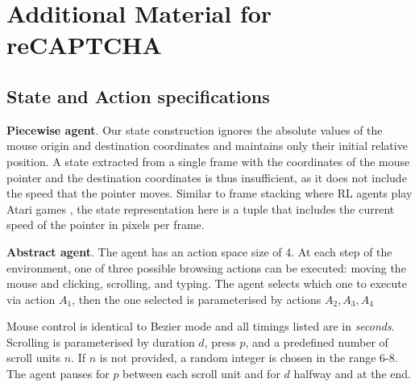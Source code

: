
\chapter{Additional Material for reCAPTCHA}\label{apx:recaptcha}

\section{State and Action specifications}
\label{appendix:b}

\textbf{Piecewise agent}. Our state construction ignores the absolute values of the mouse origin and destination coordinates and maintains only their initial relative position.
A state extracted from a single frame with the coordinates of the mouse pointer and the destination coordinates is thus insufficient, as it does not include the speed that the pointer moves.
Similar to frame stacking where \gls{RL} agents play Atari games \cite{Mnih2013}, the state representation here is a tuple that includes the current speed of the pointer in pixels per frame.


\textbf{Abstract agent}. The agent has an action space size of 4.
At each step of the environment, one of three possible browsing actions can be executed: moving the mouse and clicking, scrolling, and typing.
The agent selects which one to execute via action $A_1$, then the one selected is parameterised by actions $A_2,A_3,A_4$

Mouse control is identical to Bezier mode and all timings listed are in \textit{seconds}.
Scrolling is parameterised by duration $d$, press $p$, and a predefined number of scroll units $n$.
If $n$ is not provided, a random integer is chosen in the range 6-8.
The agent pauses for $p$ between each scroll unit and for $d$ halfway and at the end.

